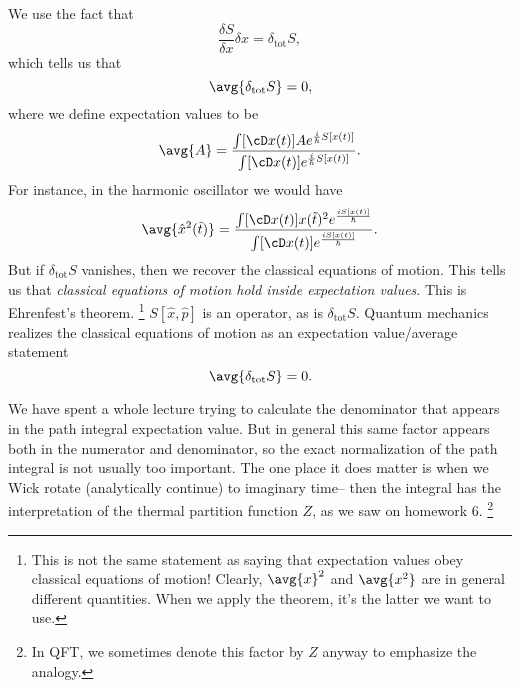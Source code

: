 We use the fact that
\begin{equation}
    \frac{\delta S}{\delta x} \delta x = \delta_\text{tot} S,
\end{equation}
which tells us that
\begin{equation}
    \avg{\delta_\text{tot} S} = 0,
\end{equation}
where we define expectation values to be
\begin{equation}
    \avg{A} = \frac{\int [\cD x(t)] A e^{\frac{i}{\hbar}S[x(t)]}}{\int [\cD x(t)] e^{\frac{i}{\hbar}S[x(t)]}}.
\end{equation}
For instance, in the harmonic oscillator we would have
\begin{equation}
    \avg{\hat x^2(\tilde t)} = \frac{\int [\cD x(t)]x(\tilde t)^2 e^{\frac{iS[x(t)]}{\hbar}}}{\int [\cD x(t)] e^{\frac{iS[x(t)]}{\hbar}}}.
\end{equation}
But if $\delta_\text{tot} S$ vanishes, then we recover the classical equations of motion. This tells us that \emph{classical equations of motion hold inside expectation values}. This is Ehrenfest's theorem.%
    \footnote{This is not the same statement as saying that expectation values obey classical equations of motion! Clearly, $\avg{x}^2$ and $\avg{x^2}$ are in general different quantities. When we apply the theorem, it's the latter we want to use.}
$S[\hat x, \hat p]$ is an operator, as is $\delta_\text{tot}S$. Quantum mechanics realizes the classical equations of motion as an expectation value/average statement
\begin{equation}
    \avg{\delta_\text{tot}S} =0.
\end{equation}

We have spent a whole lecture trying to calculate the denominator that appears in the path integral expectation value. But in general this same factor appears both in the numerator and denominator, so the exact normalization of the path integral is not usually too important. The one place it does matter is when we Wick rotate (analytically continue) to imaginary time-- then the integral has the interpretation of the thermal partition function $Z$, as we saw on homework 6.%
    \footnote{In QFT, we sometimes denote this factor by $Z$ anyway to emphasize the analogy.}

